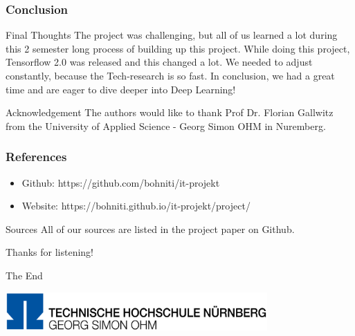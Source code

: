 \documentclass{beamer}
\begin{document}

\begin{frame}
\frametitle{Conclusion}

\begin{block}{Final Thoughts}
The project was challenging, but all of us learned a lot during this 2 semester long process of building up this project. While doing this project, Tensorflow 2.0 was released and this changed a lot. We needed to adjust constantly, because the Tech-research is so fast.
In conclusion, we had a great time and are eager to dive deeper into Deep Learning!
\end{block}

\begin{block}{Acknowledgement}
The authors would like to thank Prof Dr. Florian Gallwitz from the University of Applied Science - Georg Simon OHM in Nuremberg.
\end{block}

\end{frame}


\begin{frame}
\frametitle{References}
\begin{itemize}
\item Github: https://github.com/bohniti/it-projekt
\item Website: https://bohniti.github.io/it-projekt/project/
\end{itemize}

\begin{block}{Sources}
All of our sources are listed in the project paper on Github.
\end{block}
\begin{center}
Thanks for listening!
\end{center}
\end{frame}


\begin{frame}
\Huge{\centerline{The End}} 
\vspace{5mm}
\begin{center}
	\includegraphics[width=10cm]{photo/logo}
\end{center}
\end{frame}
\end{document}

